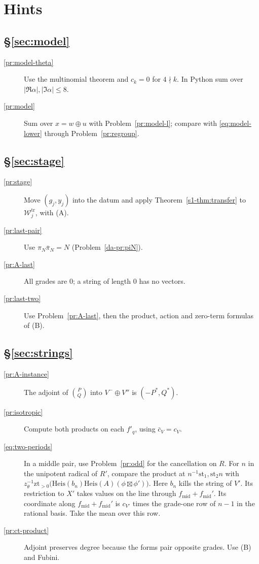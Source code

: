 \documentclass[reqno]{amsart}
\theoremstyle{definition}
\theoremstyle{plain}
\theoremstyle{remark}
\newcommand{\Wc}{\mathcal{W}}
\newcommand{\Heis}{\mathrm{Heis}}
\newcommand{\st}{\mathrm{st}}
\newcommand{\zt}{\mathrm{zt}}
\newcommand{\fm}{f_{\mathrm{mid}}}
\newcommand{\Wtr}{\Wc^{\mathrm{tr}}}
\begin{document}
\section*{Hints}
\subsection*{\S\ref{sec:model}}
\begin{description}
\item[\ref{pr:model-theta}] Use the multinomial theorem and \(c_k=0\) for \(4\nmid k\).  In Python sum over \(|\Re\alpha|,|\Im\alpha|\le8\).
\item[\ref{pr:model}] Sum over \(x = w \oplus u\) with Problem~\ref{pr:model-l}; compare with \eqref{eq:model-lower} through Problem~\ref{pr:regroup}.
\end{description}
\subsection*{\S\ref{sec:stage}}
\begin{description}
\item[\ref{pr:stage}] Move \((g_j, y_j)\) into the datum and apply Theorem~\ref{s1-thm:transfer} to \(\Wtr_j\), with (A).
\item[\ref{pr:last-pair}] Use \(\pi_N\bar\pi_N=N\) (Problem~\ref{da-pr:piN}).
\item[\ref{pr:A-last}] All grades are \(0\); a string of length \(0\) has no vectors.
\item[\ref{pr:last-two}] Use Problem~\ref{pr:A-last}, then the product, action and zero-term formulas of (B).
\end{description}
\subsection*{\S\ref{sec:strings}}
\begin{description}
\item[\ref{pr:A-instance}] The adjoint of \(\binom{P}{Q}\) into \(V^- \oplus V''\) is \((-P^*, Q^*)\).
\item[\ref{pr:isotropic}] Compute both products on each \(f'_q\), using \(\bar c_V = c_V\).
\item[\eqref{eq:two-periods}] In a middle pair, use Problem~\ref{pr:odd} for the cancellation on \(R\).  For \(n\) in the unipotent radical of \(R'\), compare the product at \(n^{-1}\st_1,\st_2n\) with \(z_\theta^{-1}\zt_{>0}\bigl(\Heis(b_n)\Heis(A)(\phi\boxtimes\phi')\bigr)\).  Here \(b_n\) kills the string of \(V'\).  Its restriction to \(X'\) takes values on the line through \(\fm+\fm'\).  Its coordinate along \(\fm+\fm'\) is \(c_{V'}\) times the grade-one row of \(n-1\) in the rational basis.  Take the mean over this row.
\item[\ref{pr:ct-product}] Adjoint preserves degree because the forms pair opposite grades.  Use (B) and Fubini.
\end{description}
\end{document}
